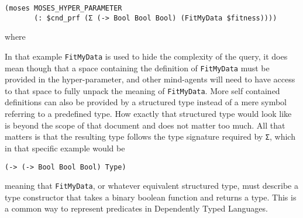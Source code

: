 \documentclass[]{report}
\begin{document}
\begin{verbatim}
(moses MOSES_HYPER_PARAMETER
       (: $cnd_prf (Σ (-> Bool Bool Bool) (FitMyData $fitness))))
\end{verbatim}
where

In that example \texttt{FitMyData} is used to hide the complexity of
the query, it does mean though that a space containing the definition
of
\texttt{FitMyData} must be provided in the hyper-parameter, and other
mind-agents will need to have access to that space to fully unpack the
meaning of \texttt{FitMyData}.  More self contained definitions can also be
provided by a structured type instead of a mere symbol referring to a
predefined type.  How exactly that structured type would look like is
beyond the scope of that document and does not matter too much.  All
that matters is that the resulting type follows the type signature
required by \texttt{Σ}, which in that specific example would be

\begin{verbatim}
(-> (-> Bool Bool Bool) Type)
\end{verbatim}
meaning that \texttt{FitMyData}, or whatever equivalent structured type, must
describe a type constructor that takes a binary boolean function and
returns a type.  This is a common way to represent predicates in
Dependently Typed Languages.
\end{document}
